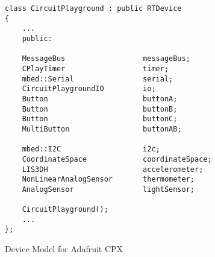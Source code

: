 \begin{figure}
\begin{lstlisting}
class CircuitPlayground : public RTDevice
{
    ...
    public:

    MessageBus                  messageBus;
    CPlayTimer                  timer;
    mbed::Serial                serial;
    CircuitPlaygroundIO         io;
    Button                      buttonA;
    Button                      buttonB;
    Button                      buttonC;
    MultiButton                 buttonAB;

    mbed::I2C                   i2c;
    CoordinateSpace             coordinateSpace;
    LIS3DH                      accelerometer;
    NonLinearAnalogSensor       thermometer;
    AnalogSensor                lightSensor;

    CircuitPlayground();
    ...
};
\end{lstlisting}
\caption{\label{fig:codalDeviceModel}Device Model for Adafruit CPX}
\end{figure}



